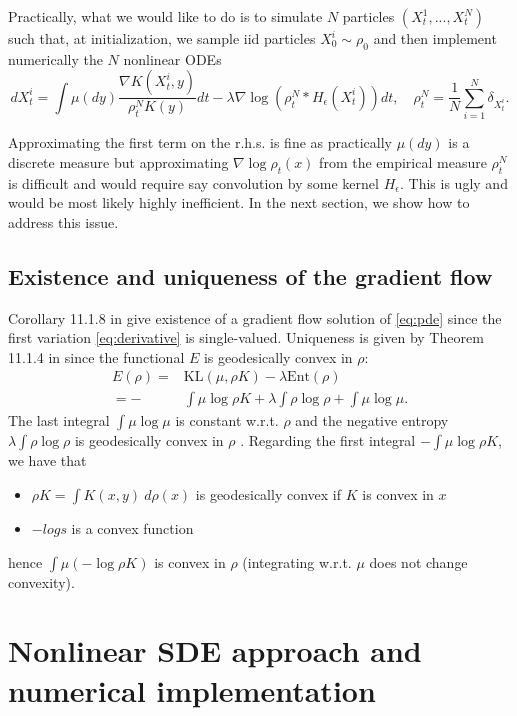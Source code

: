 \documentclass[a4paper]{article}
\begin{document}
Practically, what we would like to do is to simulate $N$ particles $(X_{t}^{1},...,X_{t}^{N})$ such that, at initialization, we sample iid particles  $X_{0}^{i}\sim\rho_{0}$ and then implement numerically the $N$ nonlinear ODEs
\[
dX_{t}^{i}=\int\mu\left(dy\right)\frac{\nabla K(X_{t}^{i},y)}{\rho_{t}^{N}K(y)}dt-\lambda\nabla\log\left(\rho_{t}^{N}*H_{\epsilon}\left(X_{t}^{i}\right)\right)dt,\quad\rho_{t}^{N}=\frac{1}{N}\sum_{i=1}^{N}\delta_{X_{t}^{i}}.
\]

Approximating the first term on the r.h.s. is fine as practically $\mu\left(dy\right)$ is a discrete measure but approximating $\nabla\log\rho_{t}\left(x\right)$ from the empirical measure $\rho_{t}^{N}$ is difficult and would require say convolution by some kernel $H_{\epsilon}$.
This is ugly and would be most likely highly inefficient.
In the next section, we show how to address this issue.

\subsection{Existence and uniqueness of the gradient flow}

Corollary 11.1.8 in \cite{ambrosio2008gradient} give existence of a gradient flow solution of \eqref{eq:pde} since the first variation \eqref{eq:derivative} is single-valued.
Uniqueness is given by Theorem 11.1.4 in \cite{ambrosio2008gradient} since the functional $E$ is geodesically convex in $\rho$:
\begin{align*}
E(\rho)= & \text{{KL}}(\mu,\rho K)-\lambda\text{{Ent}}(\rho)\\
=- & \int\mu\log\rho K+\lambda\int\rho\log\rho+\int\mu\log\mu.
\end{align*}
The last integral $\int\mu\log\mu$ is constant w.r.t. $\rho$ and the negative entropy $\lambda\int\rho\log\rho$ is geodesically convex in $\rho$ \citep[page 130]{santambrogio2017euclidean}.
Regarding the first integral $- \int\mu\log\rho K$, we have that
\begin{itemize}
\item $\rho K = \int K(x, y) \ d\rho(x)$ is geodesically convex if $K$ is convex in $x$ \citep[page 128]{santambrogio2017euclidean}
\item $-log s$ is a convex function
\end{itemize}
hence $\int\mu\left( -\log\rho K\right)$ is convex in $\rho$ (integrating w.r.t. $\mu$ does not change convexity).

\section{Nonlinear SDE approach and numerical implementation}
\end{document}
